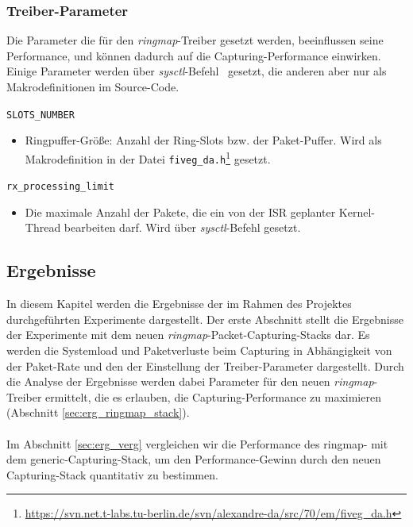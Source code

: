 {\subsubsection{Treiber-Parameter}
Die Parameter die für den \emph{ringmap}-Treiber gesetzt werden, beeinflussen
seine Performance, und können dadurch auf die Capturing-Performance einwirken.
Einige Parameter werden über \emph{sysctl}-Befehl~\cite{man_sysctl} gesetzt,
die anderen aber nur als Makrodefinitionen im Source-Code.
%
\begin{description}
	\item \verb+SLOTS_NUMBER+
		\begin{itemize}
			\item Ringpuffer-Größe: Anzahl der Ring-Slots bzw. der
				Paket-Puffer. Wird als Makrodefinition in der Datei
				\verb+fiveg_da.h+\footnote{\url{https://svn.net.t-labs.tu-berlin.de/svn/alexandre-da/src/70/em/fiveg_da.h}} gesetzt.
		\end{itemize}
	\item \verb+rx_processing_limit+
		\begin{itemize}
			\item Die maximale Anzahl der Pakete, die ein von der ISR geplanter
				Kernel-Thread bearbeiten darf. Wird über \emph{sysctl}-Befehl
				gesetzt. 
		\end{itemize}
\end{description}
}
\subsection{Ergebnisse}\label{sec:test_ergebnisse}
In diesem Kapitel werden die Ergebnisse der im Rahmen des Projektes
durchgeführten Experimente dargestellt. Der erste Abschnitt stellt die
Ergebnisse der Experimente mit dem neuen \emph{ringmap}-Packet-Capturing-Stacks dar. Es
werden die Systemload und Paketverluste beim Capturing in Abhängigkeit von der
Paket-Rate und den der Einstellung der Treiber-Parameter dargestellt. Durch die
Analyse der Ergebnisse werden dabei Parameter für den neuen
\emph{ringmap}-Treiber ermittelt, die es erlauben, die Capturing-Performance zu
maximieren (Abschnitt \ref{sec:erg_ringmap_stack}). \\\\
% 
Im Abschnitt \ref{sec:erg_verg} vergleichen wir die Performance des ringmap-
mit dem generic-Capturing-Stack, um den Performance-Gewinn durch den neuen
Capturing-Stack quantitativ zu bestimmen.

